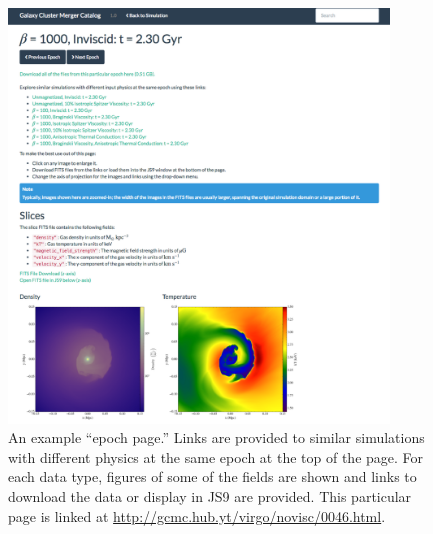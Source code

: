 \documentclass{emulateapj}
\begin{document}
\begin{figure}
\begin{center}
\includegraphics[width=0.9\textwidth]{epoch_page.eps}
\caption{An example ``epoch page.'' Links are provided to similar simulations with different physics at the same epoch at the top of the page. For each data type, figures of some of the fields are shown and links to download the data or display in JS9 are provided. This particular page is linked at \url{http://gcmc.hub.yt/virgo/novisc/0046.html}.}
\end{center}
\end{figure}
\end{document}
